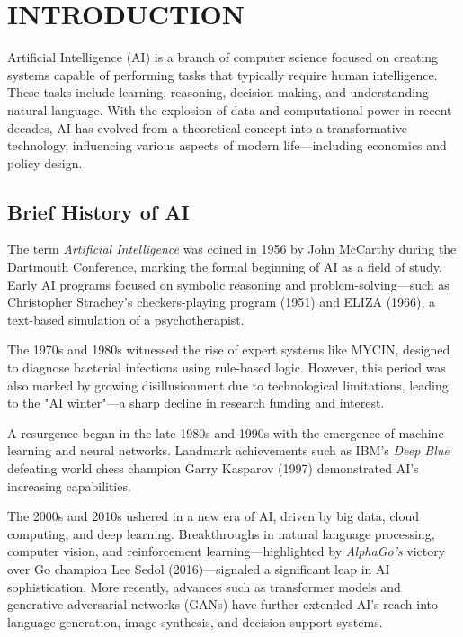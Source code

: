 \chapter{\uppercase{Introduction}}
\label{chap:introduction}

Artificial Intelligence (AI) is a branch of computer science focused on creating systems capable of performing tasks that typically require human intelligence. These tasks include learning, reasoning, decision-making, and understanding natural language. With the explosion of data and computational power in recent decades, AI has evolved from a theoretical concept into a transformative technology, influencing various aspects of modern life—including economics and policy design. \citep{googleai-overview}

\section{Brief History of AI}
\label{sec:history-of-ai}

The term \textit{Artificial Intelligence} was coined in 1956 by John McCarthy during the Dartmouth Conference, marking the formal beginning of AI as a field of study. Early AI programs focused on symbolic reasoning and problem-solving—such as Christopher Strachey’s checkers-playing program (1951) and ELIZA (1966), a text-based simulation of a psychotherapist.

The 1970s and 1980s witnessed the rise of expert systems like MYCIN, designed to diagnose bacterial infections using rule-based logic. However, this period was also marked by growing disillusionment due to technological limitations, leading to the "AI winter"—a sharp decline in research funding and interest.

A resurgence began in the late 1980s and 1990s with the emergence of machine learning and neural networks. Landmark achievements such as IBM’s \textit{Deep Blue} defeating world chess champion Garry Kasparov (1997) demonstrated AI’s increasing capabilities.

The 2000s and 2010s ushered in a new era of AI, driven by big data, cloud computing, and deep learning. Breakthroughs in natural language processing, computer vision, and reinforcement learning—highlighted by \textit{AlphaGo’s} victory over Go champion Lee Sedol (2016)—signaled a significant leap in AI sophistication. More recently, advances such as transformer models and generative adversarial networks (GANs) have further extended AI’s reach into language generation, image synthesis, and decision support systems. \citep{tableauhistory}

